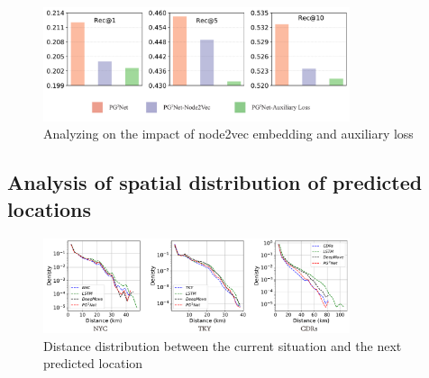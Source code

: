 \documentclass[10pt,journal,compsoc]{IEEEtran}
\begin{document}
\begin{figure}[htpb]
    \centering
    \includegraphics[width=9cm]{figure/xiao.pdf}
    \caption{Analyzing on the impact of node2vec embedding and auxiliary loss}
    \label{fig.13}
\end{figure}

\subsection{Analysis of spatial distribution of predicted locations}

\begin{figure}[htpb]
    \centering
    \includegraphics[width=9cm]{figure/fig14.pdf}
    \caption{Distance distribution between the current situation and the next predicted location}
    \label{fig.14}
\end{figure}

\end{document}
